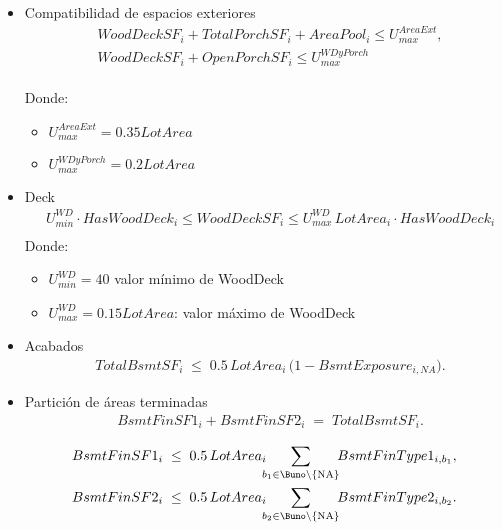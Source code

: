 \begin{itemize}
    \item {Compatibilidad de espacios exteriores}\\
\begin{align}
& WoodDeckSF_i + TotalPorchSF_i + AreaPool_i \le U_{max}^{AreaExt},\\
& WoodDeckSF_i + OpenPorchSF_i \le U_{max}^{WDyPorch}
\end{align}\\
Donde:\\
    \begin{itemize}
        \item $U_{max}^{AreaExt}=0.35LotArea$
        \item $U_{max}^{WDyPorch}=0.2LotArea$
    \end{itemize}
    \item {Deck}\\
\begin{align}
& U_{min}^{WD} \cdot HasWoodDeck_i \leq WoodDeckSF_i \leq  U_{max}^{WD}\,LotArea_i \cdot HasWoodDeck_i\\
\end{align}
Donde:\\
    \begin{itemize}
        \item $U_{min}^{WD}=40$ valor mínimo de WoodDeck
        \item $U_{max}^{WD}=0.15LotArea$: valor máximo de WoodDeck
    \end{itemize}

    \item {Acabados}
\begin{align}
& TotalBsmtSF_i \;\le\; 0.5\,LotArea_i \,\big(1 - BsmtExposure_{i,NA}\big). \label{eq:bsmt-cap}
\end{align}

    \item Partición de áreas terminadas
\begin{align}
& BsmtFinSF1_i + BsmtFinSF2_i \;=\; TotalBsmtSF_i. 

\end{align}

\begin{align}
BsmtFinSF1_i \;\le\; 0.5\,LotArea_i \!\!\!\sum_{b_1\in \Buno\setminus\{\text{NA}\}}\!\! BsmtFinType1_{i,b_1}, \label{eq:fin1-on}\\
BsmtFinSF2_i \;\le\; 0.5\,LotArea_i \!\!\!\sum_{b_2\in \Buno\setminus\{\text{NA}\}}\!\! BsmtFinType2_{i,b_2}. \label{eq:fin2-on}
\end{align}


\end{itemize}
